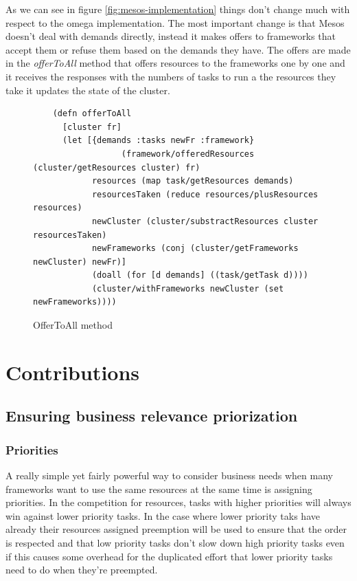 \documentclass{report}                     %
\begin{document}
As we can see in figure \ref{fig:mesos-implementation} things don't
change much with respect to the omega implementation. The most
important change is that Mesos doesn't deal with demands directly,
instead it makes offers to frameworks that accept them or refuse them
based on the demands they have. The offers are made in the \emph{offerToAll}
method that offers resources to the frameworks one by one and it
receives the responses with the numbers of tasks to run a the
resources they take it updates the state of the cluster.

\begin{figure}[!ht]
\centering
\begin{verbatim}
    (defn offerToAll
      [cluster fr]
      (let [{demands :tasks newFr :framework}
                  (framework/offeredResources (cluster/getResources cluster) fr)
            resources (map task/getResources demands)
            resourcesTaken (reduce resources/plusResources resources)
            newCluster (cluster/substractResources cluster resourcesTaken)
            newFrameworks (conj (cluster/getFrameworks newCluster) newFr)]
            (doall (for [d demands] ((task/getTask d))))
            (cluster/withFrameworks newCluster (set newFrameworks))))

\end{verbatim}

\caption{OfferToAll method}
\label{fig:mesos-offerToAll}
\end{figure}

\chapter{Contributions}

\section{Ensuring business relevance priorization}

\label{sec:businessrelevance}

\subsection{Priorities}

A really simple yet fairly powerful way to consider business needs
when many frameworks want to use the same resources at the same time
is assigning priorities. In the competition for resources, tasks with
higher priorities will always win against lower priority tasks. In the
case where lower priority taks have already their resources assigned
preemption will be used to ensure that the order is respected and that
low priority tasks don't slow down high priority tasks even if this
causes some overhead for the duplicated effort that lower priority
tasks need to do when they're preempted.
\end{document}
